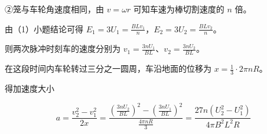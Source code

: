 \documentclass[\gkver]{gaokaozhenti}
\begin{document}
\begin{enumerate}
{②笼与车轮角速度相同，由 $v=\omega r$ 可知车速为棒切割速度的 $n$ 倍。

由（1）小题结论可得 $E_{1}=3U_{1}=\frac{BLv_{1}}{n}$，$E_{2}=3U_{2}=\frac{BLv_{2}}{n}$。

则两次脉冲时刻车的速度分别为 $v_{1}=\frac{3nU_{1}}{BL}$、$v_{2}=\frac{3nU_{2}}{BL}$。

在这段时间内车轮转过三分之一圆周，车沿地面的位移为 $x=\frac{1}{3}\cdot2\pi nR$。

得加速度大小

\[a=\frac{v_{2}^{2}-v_{1}^{2}}{2x}=\frac{\left(\frac{3nU_{2}}{BL}\right)^{2}-\left(\frac{3nU_{1}}{BL}\right)^{2}}{\frac{4\pi nR}{3}}=\frac{27n(U_{2}^{2}-U_{1}^{2})}{4\pi B^{2}L^{2}R}\]
}

\end{enumerate}
\end{document}
